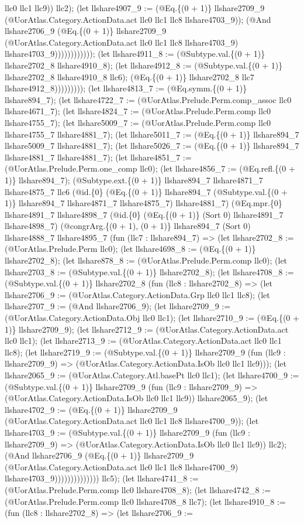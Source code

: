 \documentclass[11pt]{article}
\begin{document}
llc0 llc1 llc9)) llc2); (let llshare4907\_9 := (@Eq.\{(0 + 1)\} llshare2709\_9 (@UorAtlas.Category.ActionData.act llc0 llc1 llc8 llshare4703\_9)); (@And llshare2706\_9 (@Eq.\{(0 + 1)\} llshare2709\_9 (@UorAtlas.Category.ActionData.act llc0 llc1 llc8 llshare4703\_9) llshare4703\_9)))))))))))); (let llshare4911\_8 := (@Subtype.val.\{(0 + 1)\} llshare2702\_8 llshare4910\_8); (let llshare4912\_8 := (@Subtype.val.\{(0 + 1)\} llshare2702\_8 llshare4910\_8 llc6); (@Eq.\{(0 + 1)\} llshare2702\_8 llc7 llshare4912\_8))))))))); (let llshare4813\_7 := (@Eq.symm.\{(0 + 1)\} llshare894\_7); (let llshare4722\_7 := (@UorAtlas.Prelude.Perm.comp\_assoc llc0 llshare4671\_7); (let llshare4824\_7 := (@UorAtlas.Prelude.Perm.comp llc0 llshare4755\_7); (let llshare5009\_7 := (@UorAtlas.Prelude.Perm.comp llc0 llshare4755\_7 llshare4881\_7); (let llshare5011\_7 := (@Eq.\{(0 + 1)\} llshare894\_7 llshare5009\_7 llshare4881\_7); (let llshare5026\_7 := (@Eq.\{(0 + 1)\} llshare894\_7 llshare4881\_7 llshare4881\_7); (let llshare4851\_7 := (@UorAtlas.Prelude.Perm.one\_comp llc0); (let llshare4856\_7 := (@Eq.refl.\{(0 + 1)\} llshare894\_7); (@Subtype.ext.\{(0 + 1)\} llshare894\_7 llshare4871\_7 llshare4875\_7 llc6 (@id.\{0\} (@Eq.\{(0 + 1)\} llshare894\_7 (@Subtype.val.\{(0 + 1)\} llshare894\_7 llshare4871\_7 llshare4875\_7) llshare4881\_7) (@Eq.mpr.\{0\} llshare4891\_7 llshare4898\_7 (@id.\{0\} (@Eq.\{(0 + 1)\} (Sort 0) llshare4891\_7 llshare4898\_7) (@congrArg.\{(0 + 1), (0 + 1)\} llshare894\_7 (Sort 0) llshare4888\_7 llshare4895\_7 (fun (llc7 : llshare894\_7) => (let llshare2702\_8 := (@UorAtlas.Prelude.Perm llc0); (let llshare4698\_8 := (@Eq.\{(0 + 1)\} llshare2702\_8); (let llshare878\_8 := (@UorAtlas.Prelude.Perm.comp llc0); (let llshare2703\_8 := (@Subtype.val.\{(0 + 1)\} llshare2702\_8); (let llshare4708\_8 := (@Subtype.val.\{(0 + 1)\} llshare2702\_8 (fun (llc8 : llshare2702\_8) => (let llshare2706\_9 := (@UorAtlas.Category.ActionData.Grp llc0 llc1 llc8); (let llshare2707\_9 := (@And llshare2706\_9); (let llshare2709\_9 := (@UorAtlas.Category.ActionData.Obj llc0 llc1); (let llshare2710\_9 := (@Eq.\{(0 + 1)\} llshare2709\_9); (let llshare2712\_9 := (@UorAtlas.Category.ActionData.act llc0 llc1); (let llshare2713\_9 := (@UorAtlas.Category.ActionData.act llc0 llc1 llc8); (let llshare2719\_9 := (@Subtype.val.\{(0 + 1)\} llshare2709\_9 (fun (llc9 : llshare2709\_9) => (@UorAtlas.Category.ActionData.IsOb llc0 llc1 llc9))); (let llshare2065\_9 := (@UorAtlas.Category.Atl.basePt llc0 llc1); (let llshare4700\_9 := (@Subtype.val.\{(0 + 1)\} llshare2709\_9 (fun (llc9 : llshare2709\_9) => (@UorAtlas.Category.ActionData.IsOb llc0 llc1 llc9)) llshare2065\_9); (let llshare4702\_9 := (@Eq.\{(0 + 1)\} llshare2709\_9 (@UorAtlas.Category.ActionData.act llc0 llc1 llc8 llshare4700\_9)); (let llshare4703\_9 := (@Subtype.val.\{(0 + 1)\} llshare2709\_9 (fun (llc9 : llshare2709\_9) => (@UorAtlas.Category.ActionData.IsOb llc0 llc1 llc9)) llc2); (@And llshare2706\_9 (@Eq.\{(0 + 1)\} llshare2709\_9 (@UorAtlas.Category.ActionData.act llc0 llc1 llc8 llshare4700\_9) llshare4703\_9)))))))))))))) llc5); (let llshare4741\_8 := (@UorAtlas.Prelude.Perm.comp llc0 llshare4708\_8); (let llshare4742\_8 := (@UorAtlas.Prelude.Perm.comp llc0 llshare4708\_8 llc7); (let llshare4910\_8 := (fun (llc8 : llshare2702\_8) => (let llshare2706\_9 := 
\end{document}
